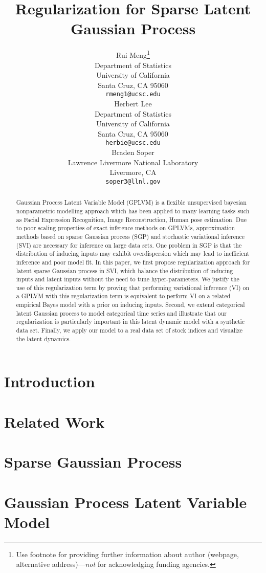 \documentclass{article}
\title{Regularization for Sparse Latent Gaussian Process}
\author{%
	Rui Meng\thanks{Use footnote for providing further information
		about author (webpage, alternative address)---\emph{not} for acknowledging
		funding agencies.} \\
	Department of Statistics\\
	University of California\\
	Santa Cruz, CA 95060 \\
	\texttt{rmeng1@ucsc.edu} \\
	\And
	Herbert Lee \\
	Department of Statistics\\
	University of California\\
	Santa Cruz, CA 95060 \\
	\texttt{herbie@ucsc.edu} \\
    \And
	Braden Soper \\
	Lawrence Livermore National Laboratory \\
	Livermore, CA \\
	\texttt{soper3@llnl.gov} \\
}
\begin{document}
	
	\maketitle
	
\begin{abstract}
	Gaussian Process Latent Variable Model (GPLVM) is a flexible unsupervised bayesian nonparametric modelling approach which has been applied to many learning tasks such as Facial Expression Recognition, Image Reconstruction, Human pose estimation. Due to poor scaling properties of exact inference methods on GPLVMs, approximation methods based on sparse Gaussian process (SGP) and stochastic variational inference (SVI) are necessary for inference on large data sets. One problem in SGP is that the distribution of inducing inputs may exhibit overdispersion which may lead to inefficient inference and poor model fit. In this paper, we first propose regularization approach for latent sparse Gaussian process in SVI, which balance the distribution of inducing inputs and latent inputs without the need to tune hyper-parameters. We justify the use of this regularization term by proving that performing variational inference (VI) on a GPLVM with this regularization term is equivalent to perform VI on a related empirical Bayes model with a prior on inducing inputs. Second, we extend categorical latent Gaussian process to model categorical time series and illustrate that our regularization is particularly important in this latent dynamic model with a synthetic data set. Finally, we apply our model to a real data set of stock indices and visualize the latent dynamics.
\end{abstract}

\section{Introduction}


\section{Related Work}

\section{Sparse Gaussian Process}
	
\section{Gaussian Process Latent Variable Model}
\end{document}
